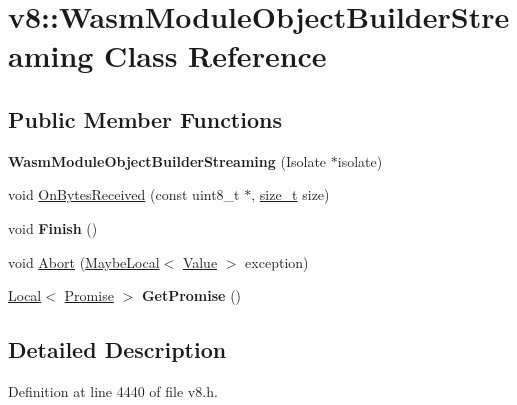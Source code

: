 \hypertarget{classv8_1_1WasmModuleObjectBuilderStreaming}{}\section{v8\+:\+:Wasm\+Module\+Object\+Builder\+Streaming Class Reference}
\label{classv8_1_1WasmModuleObjectBuilderStreaming}
\subsection*{Public Member Functions}
\begin{DoxyCompactItemize}
\item 
\mbox{\label{classv8_1_1WasmModuleObjectBuilderStreaming_a38ecb92cde61095525a4b2728ba091aa}} 
{\bfseries Wasm\+Module\+Object\+Builder\+Streaming} (Isolate $\ast$isolate)
\item 
void \mbox{\hyperlink{classv8_1_1WasmModuleObjectBuilderStreaming_ac67b675b7241a18a3b773dab2f0fd458}{On\+Bytes\+Received}} (const uint8\+\_\+t $\ast$, \mbox{\hyperlink{classsize__t}{size\+\_\+t}} size)
\item 
\mbox{\label{classv8_1_1WasmModuleObjectBuilderStreaming_a679a8781a81a4c926e82924d1a2f2446}} 
void {\bfseries Finish} ()
\item 
void \mbox{\hyperlink{classv8_1_1WasmModuleObjectBuilderStreaming_ac8a2a6e122799d746ded69f80a295fb5}{Abort}} (\mbox{\hyperlink{classv8_1_1MaybeLocal}{Maybe\+Local}}$<$ \mbox{\hyperlink{classv8_1_1Value}{Value}} $>$ exception)
\item 
\mbox{\label{classv8_1_1WasmModuleObjectBuilderStreaming_a71f39c9483219ec7b866da416c321590}} 
\mbox{\hyperlink{classv8_1_1Local}{Local}}$<$ \mbox{\hyperlink{classv8_1_1Promise}{Promise}} $>$ {\bfseries Get\+Promise} ()
\end{DoxyCompactItemize}


\subsection{Detailed Description}


Definition at line 4440 of file v8.\+h.




